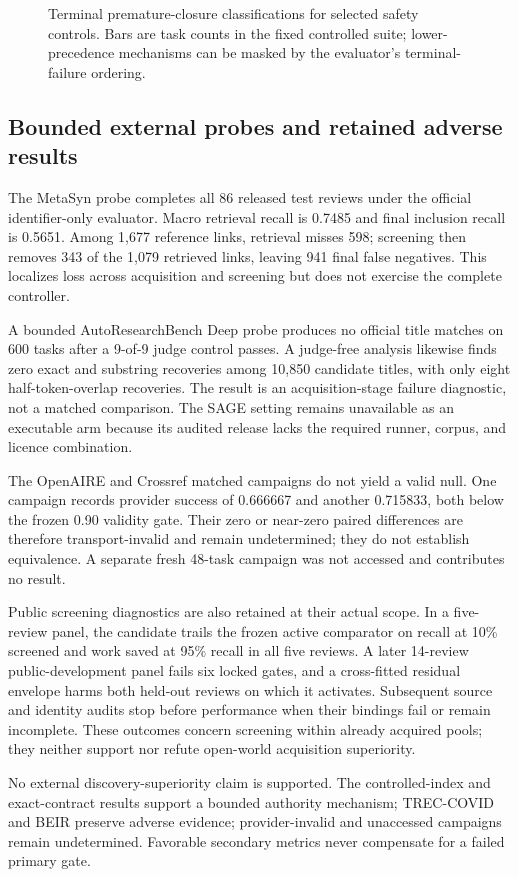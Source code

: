 \begin{figure}[t]
\centering

\caption{Terminal premature-closure classifications for selected safety
controls. Bars are task counts in the fixed controlled suite; lower-precedence
mechanisms can be masked by the evaluator's terminal-failure ordering.}
\label{fig:p2-6}
\end{figure}

\subsection{Bounded external probes and retained adverse results}
The MetaSyn probe completes all 86 released test reviews under the official
identifier-only evaluator. Macro retrieval recall is 0.7485 and final inclusion
recall is 0.5651. Among 1,677 reference links, retrieval misses 598; screening
then removes 343 of the 1,079 retrieved links, leaving 941 final false negatives.
This localizes loss across acquisition and screening but does not exercise the
complete controller.

A bounded AutoResearchBench Deep probe produces no official title matches on
600 tasks after a 9-of-9 judge control passes. A judge-free analysis likewise
finds zero exact and substring recoveries among 10,850 candidate titles, with
only eight half-token-overlap recoveries. The result is an acquisition-stage
failure diagnostic, not a matched comparison. The SAGE setting remains
unavailable as an executable arm because its audited release lacks the required
runner, corpus, and licence combination.

The OpenAIRE and Crossref matched campaigns do not yield a valid null. One
campaign records provider success of 0.666667 and another 0.715833, both below
the frozen 0.90 validity gate. Their zero or near-zero paired differences are
therefore transport-invalid and remain undetermined; they do not establish
equivalence. A separate fresh 48-task campaign was not accessed and contributes
no result.

Public screening diagnostics are also retained at their actual scope. In a
five-review panel, the candidate trails the frozen active comparator on recall
at 10\% screened and work saved at 95\% recall in all five reviews. A later
14-review public-development panel fails six locked gates, and a cross-fitted
residual envelope harms both held-out reviews on which it activates. Subsequent
source and identity audits stop before performance when their bindings fail or
remain incomplete. These outcomes concern screening within already acquired
pools; they neither support nor refute open-world acquisition superiority.

No external discovery-superiority claim is supported. The controlled-index and
exact-contract results support a bounded authority mechanism; TREC-COVID and
BEIR preserve adverse evidence; provider-invalid and unaccessed campaigns remain
undetermined. Favorable secondary metrics never compensate for a failed primary
gate.

